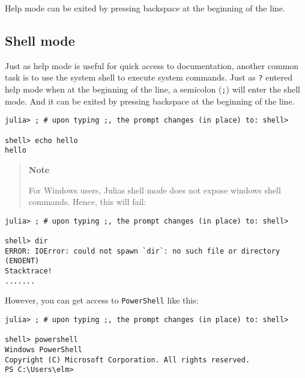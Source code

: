 Help mode can be exited by pressing backspace at the beginning of the line.



\hypertarget{17654100848947676892}{}


\subsection{Shell mode}



Just as help mode is useful for quick access to documentation, another common task is to use the system shell to execute system commands. Just as \texttt{?} entered help mode when at the beginning of the line, a semicolon (\texttt{;}) will enter the shell mode. And it can be exited by pressing backspace at the beginning of the line.




\begin{verbatim}
julia> ; # upon typing ;, the prompt changes (in place) to: shell>

shell> echo hello
hello
\end{verbatim}



\begin{quote}
\textbf{Note}

For Windows users, Julia{\textquotesingle}s shell mode does not expose windows shell commands. Hence, this will fail:

\end{quote}



\begin{verbatim}
julia> ; # upon typing ;, the prompt changes (in place) to: shell>

shell> dir
ERROR: IOError: could not spawn `dir`: no such file or directory (ENOENT)
Stacktrace!
.......
\end{verbatim}



However, you can get access to \texttt{PowerShell} like this:




\begin{verbatim}
julia> ; # upon typing ;, the prompt changes (in place) to: shell>

shell> powershell
Windows PowerShell
Copyright (C) Microsoft Corporation. All rights reserved.
PS C:\Users\elm>
\end{verbatim}



